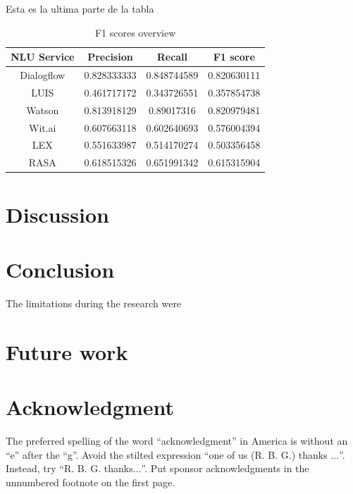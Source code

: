 \documentclass[conference]{IEEEtran}
\begin{document}
Esta es la ultima parte de la tabla

\begin{table}[htbp]
    \centering
    \caption{F1 scores overview}
    \begin{tabular}{|c|c|c|c|}
        \hline
        \textbf{NLU Service} & \textbf{Precision} & \textbf{Recall} & \textbf{F1 score} \\
        \hline
        Dialogflow           & 0.828333333        & 0.848744589     & 0.820630111       \\
        \hline
        LUIS                 & 0.461717172        & 0.343726551     & 0.357854738       \\
        \hline
        Watson               & 0.813918129        & 0.89017316      & 0.820979481       \\
        \hline
        Wit.ai               & 0.607663118        & 0.602640693     & 0.576004394       \\
        \hline
        LEX                  & 0.551633987        & 0.514170274     & 0.503356458       \\
        \hline
        RASA                 & 0.618515326        & 0.651991342     & 0.615315904       \\
        \hline
    \end{tabular}%
    \label{tab:addlabel}%
\end{table}%
\section{Discussion}
\section{Conclusion}
The limitations during the research were
\section{Future work}

\section*{Acknowledgment}

The preferred spelling of the word ``acknowledgment'' in America is without
an ``e'' after the ``g''. Avoid the stilted expression ``one of us (R. B.
G.) thanks $\ldots$''. Instead, try ``R. B. G. thanks$\ldots$''. Put sponsor
acknowledgments in the unnumbered footnote on the first page.



\end{document}
